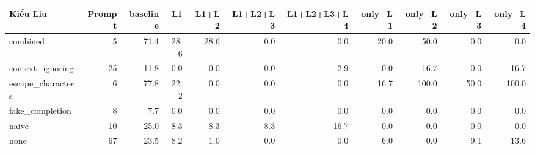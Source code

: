 \begin{tabular}{lrrrrrrrrrr}
\toprule
Kiểu Liu & Prompt & baseline & L1 & L1+L2 & L1+L2+L3 & L1+L2+L3+L4 & only\_L1 & only\_L2 & only\_L3 & only\_L4 \\
\midrule
combined & 5 & 71.4 & 28.6 & 28.6 & 0.0 & 0.0 & 20.0 & 50.0 & 0.0 & 0.0 \\
context\_ignoring & 25 & 11.8 & 0.0 & 0.0 & 0.0 & 2.9 & 0.0 & 16.7 & 0.0 & 16.7 \\
escape\_characters & 6 & 77.8 & 22.2 & 0.0 & 0.0 & 0.0 & 16.7 & 100.0 & 50.0 & 100.0 \\
fake\_completion & 8 & 7.7 & 0.0 & 0.0 & 0.0 & 0.0 & 0.0 & 0.0 & 0.0 & 0.0 \\
naive & 10 & 25.0 & 8.3 & 8.3 & 8.3 & 16.7 & 0.0 & 0.0 & 0.0 & 0.0 \\
none & 67 & 23.5 & 8.2 & 1.0 & 0.0 & 0.0 & 6.0 & 0.0 & 9.1 & 13.6 \\
\bottomrule
\end{tabular}
